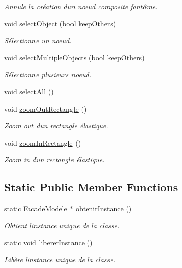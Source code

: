 \begin{DoxyCompactItemize}
\begin{DoxyCompactList}\small\item\em Annule la création d\textquotesingle{}un noeud composite fantôme. \end{DoxyCompactList}\item 
void \hyperlink{group__inf2990_gaa1eea4eb52c6ec22980e0b21e2bdbcd4}{select\+Object} (bool keep\+Others)
\begin{DoxyCompactList}\small\item\em Sélectionne un noeud. \end{DoxyCompactList}\item 
void \hyperlink{group__inf2990_ga7cbdab19081ab5e385cff2862e0642cd}{select\+Multiple\+Objects} (bool keep\+Others)
\begin{DoxyCompactList}\small\item\em Sélectionne plusieurs noeud. \end{DoxyCompactList}\item 
void \hyperlink{group__inf2990_ga91c3543726ad826767a5f1fdd42138f8}{select\+All} ()
\item 
void \hyperlink{group__inf2990_ga9b2a60b7b9392f6284e2fb7560e9c7f8}{zoom\+Out\+Rectangle} ()
\begin{DoxyCompactList}\small\item\em Zoom out d\textquotesingle{}un rectangle élastique. \end{DoxyCompactList}\item 
void \hyperlink{group__inf2990_ga10c88f159ad8d8ff9b17927d7ca50a0e}{zoom\+In\+Rectangle} ()
\begin{DoxyCompactList}\small\item\em Zoom in d\textquotesingle{}un rectangle élastique. \end{DoxyCompactList}\end{DoxyCompactItemize}
\subsection*{Static Public Member Functions}
\begin{DoxyCompactItemize}
\item 
static \hyperlink{class_facade_modele}{Facade\+Modele} $\ast$ \hyperlink{group__inf2990_ga63593b81c6f3cc2251e2b61d9e8fc670}{obtenir\+Instance} ()
\begin{DoxyCompactList}\small\item\em Obtient l\textquotesingle{}instance unique de la classe. \end{DoxyCompactList}\item 
static void \hyperlink{group__inf2990_gacbf0495fda26f5be37089470dc5f4372}{liberer\+Instance} ()
\begin{DoxyCompactList}\small\item\em Libère l\textquotesingle{}instance unique de la classe. \end{DoxyCompactList}\end{DoxyCompactItemize}


